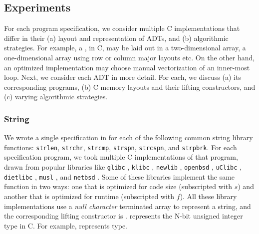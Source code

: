 

\subsection{Experiments}
For each \SpecL{} program specification, we consider multiple
C implementations that differ in their (a) layout and representation of ADTs, and
(b) algorithmic strategies. For example, a , in C, may be laid out
in a two-dimensional array, a one-dimensional array using row or column major
layouts etc. On the other hand, an optimized implementation may choose manual vectorization
of an inner-most loop. Next, we consider each ADT in more detail. For each,
we discuss (a) its corresponding programs, (b) C memory layouts and their lifting
constructors, and (c) varying algorithmic strategies.




\subsubsection{String} We wrote a single specification in \SpecL{} for each of the
following
common string library functions: {\tt strlen}, {\tt strchr}, {\tt strcmp}, {\tt strspn},
{\tt strcspn}, and {\tt strpbrk}.  For each specification
program, we took multiple C implementations of that program, drawn from popular
libraries like {\tt glibc} \cite{glibc}, {\tt klibc} \cite{klibc}, {\tt newlib} \cite{newlib},
{\tt openbsd} \cite{openbsdlibc}, {\tt uClibc} \cite{uclibc},
{\tt dietlibc} \cite{dietlibc}, {\tt musl} \cite{musl}, and {\tt netbsd} \cite{netbsd}.
Some of these libraries implement the same function in two ways: one that is optimized
for code size (subscripted with $s$) and another that is optimized for runtime (subscripted with $f$).
All these library implementations use a {\em null character} terminated array to represent
a string, and the
corresponding lifting constructor is .
 represents the N-bit unsigned integer type in C.
For example,  represents  type.

